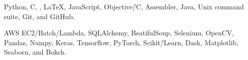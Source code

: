 
{%
	Python, C, \CPP\@, \LaTeX, JavaScript, Objective\=/C, Assembler, Java, Unix command suite, Git, and GitHub.
}
\vspace{0.5em}

{%
	AWS EC2/\nsp{}Batch/\nsp{}Lambda, SQLAlchemy, BeatifulSoup, Selenium, OpenCV, Pandas, Numpy, Keras, Tensorflow, PyTorch, Scikit\=/Learn, Dask, Matplotlib, Seaborn, and Bokeh.
}




